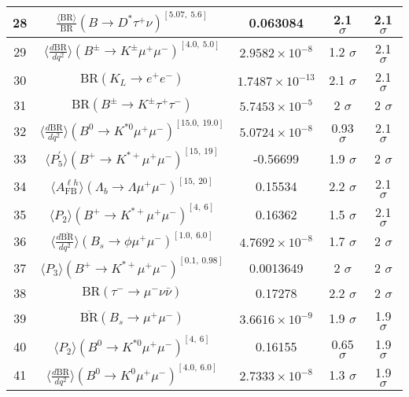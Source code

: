 \begin{longtable}{|c|c|c|c|c|}
28 &	 $\frac{\langle \mathrm{BR} \rangle}{\mathrm{BR}}(B\to D^\ast\tau^+\nu)^{[5.07,\  5.6]}$ &	 0.063084 &	 \cellcolor{green!0}2.1 $ \sigma$ &	 2.1 $ \sigma$ \\ \hline
29 &	 $\langle \frac{d\mathrm{BR}}{dq^2} \rangle(B^\pm\to K^\pm \mu^+\mu^-)^{[4.0,\  5.0]}$ &	 $2.9582\times 10^{-8}$ &	 \cellcolor{green!42}1.2 $ \sigma$ &	 2.1 $ \sigma$ \\ \hline
30 &	 $\mathrm{BR}(K_L\to e^+e^-)$ &	 $1.7487\times 10^{-13}$ &	 \cellcolor{red!0}2.1 $ \sigma$ &	 2.1 $ \sigma$ \\ \hline
31 &	 $\mathrm{BR}(B^\pm\to K^\pm \tau^+\tau^-)$ &	 $5.7453\times 10^{-5}$ &	 \cellcolor{green!4}2 $ \sigma$ &	 2 $ \sigma$ \\ \hline
32 &	 $\langle \frac{d\mathrm{BR}}{dq^2} \rangle(B^0\to K^{\ast 0}\mu^+\mu^-)^{[15.0,\  19.0]}$ &	 $5.0724\times 10^{-8}$ &	 \cellcolor{green!50}0.93 $ \sigma$ &	 2.1 $ \sigma$ \\ \hline
33 &	 $\langle P_5^\prime\rangle(B^+\to K^{\ast +}\mu^+\mu^-)^{[15,\  19]}$ &	 -0.56699 &	 \cellcolor{green!8}1.9 $ \sigma$ &	 2 $ \sigma$ \\ \hline
34 &	 $\langle A_\mathrm{FB}^{\ell h}\rangle(\Lambda_b\to\Lambda \mu^+\mu^-)^{[15,\  20]}$ &	 0.15534 &	 \cellcolor{red!9}2.2 $ \sigma$ &	 2.1 $ \sigma$ \\ \hline
35 &	 $\langle P_2\rangle(B^+\to K^{\ast +}\mu^+\mu^-)^{[4,\  6]}$ &	 0.16362 &	 \cellcolor{green!29}1.5 $ \sigma$ &	 2.1 $ \sigma$ \\ \hline
36 &	 $\langle \frac{d\overline{\mathrm{BR}}}{dq^2} \rangle(B_s\to \phi \mu^+\mu^-)^{[1.0,\  6.0]}$ &	 $4.7692\times 10^{-8}$ &	 \cellcolor{green!18}1.7 $ \sigma$ &	 2 $ \sigma$ \\ \hline
37 &	 $\langle P_3\rangle(B^+\to K^{\ast +}\mu^+\mu^-)^{[0.1,\  0.98]}$ &	 0.0013649 &	 \cellcolor{green!0}2 $ \sigma$ &	 2 $ \sigma$ \\ \hline
38 &	 $\mathrm{BR}(\tau^-\to \mu^- \nu\bar\nu)$ &	 0.17278 &	 \cellcolor{red!11}2.2 $ \sigma$ &	 2 $ \sigma$ \\ \hline
39 &	 $\overline{\mathrm{BR}}(B_s\to \mu^+\mu^-)$ &	 $3.6616\times 10^{-9}$ &	 \cellcolor{green!0}1.9 $ \sigma$ &	 1.9 $ \sigma$ \\ \hline
40 &	 $\langle P_2\rangle(B^0\to K^{\ast 0}\mu^+\mu^-)^{[4,\  6]}$ &	 0.16155 &	 \cellcolor{green!50}0.65 $ \sigma$ &	 1.9 $ \sigma$ \\ \hline
41 &	 $\langle \frac{d\mathrm{BR}}{dq^2} \rangle(B^0\to K^0\mu^+\mu^-)^{[4.0,\  6.0]}$ &	 $2.7333\times 10^{-8}$ &	 \cellcolor{green!31}1.3 $ \sigma$ &	 1.9 $ \sigma$ \\ \hline

\end{longtable}

